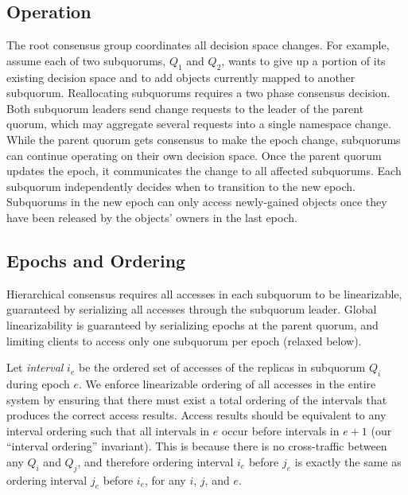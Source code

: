\documentclass[sigconf]{acmart}
\begin{document}
\subsection{Operation}

The root consensus group coordinates all decision space changes.
%
For example, assume
each of two subquorums, $Q_1$ and $Q_2$, wants to give up a portion of its
existing decision space and to add objects currently mapped to another subquorum.
Reallocating subquorums requires a two phase consensus decision.
Both subquorum leaders send change requests to the leader of the parent quorum, which may
aggregate several requests into a single namespace change.
While the parent quorum gets consensus to make the epoch change, subquorums can continue
operating on their own decision space.
Once the parent quorum updates the epoch, it communicates the change to all affected
subquorums.
Each subquorum independently decides when to transition to the new epoch.
Subquorums in the new epoch can only access newly-gained objects once they have been
released by the objects' owners in the last epoch.

\subsection{Epochs and Ordering}

Hierarchical consensus requires all accesses in each subquorum to be linearizable,
guaranteed by serializing all accesses through the subquorum leader.
Global linearizability is guaranteed by serializing epochs at the parent
quorum, and limiting clients to access only one subquorum per epoch (relaxed
below).

Let \emph{interval} $i_e$ be the ordered set of accesses of the replicas in subquorum
$Q_i$ during epoch $e$.
We enforce linearizable ordering of all accesses in the entire system by
ensuring that there must exist a total ordering of the intervals that produces the correct
access results.
Access results should be equivalent to any interval ordering
such that all intervals in $e$ occur before intervals in $e+1$ (our ``interval
ordering'' invariant).
This is because there is no cross-traffic between any $Q_i$ and $Q_j$, and therefore
ordering interval $i_e$ before $j_e$ is exactly the same as ordering interval $j_e$
before $i_e$, for any $i$, $j$, and $e$.
\end{document}
